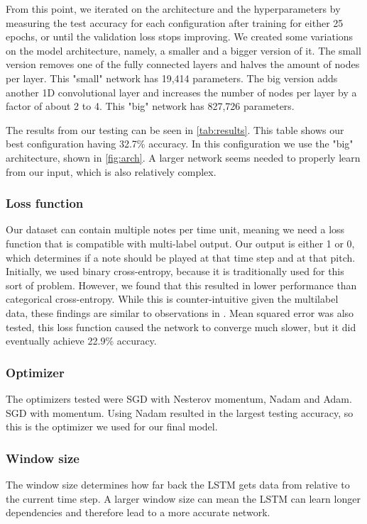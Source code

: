 \documentclass[11pt, twocolumn]{article}
\begin{document}
From this point, we iterated on the architecture and the hyperparameters by measuring the test accuracy for each configuration after training for either 25 epochs, or until the validation loss stops improving. We created some variations on the model architecture, namely, a smaller and a bigger version of it. The small version removes one of the fully connected layers and halves the amount of nodes per layer. This "small" network has 19,414 parameters. The big version adds another 1D convolutional layer and increases the number of nodes per layer by a factor of about 2 to 4. This "big" network has 827,726 parameters.

The results from our testing can be seen in \autoref{tab:results}. This table shows our best configuration having 32.7\% accuracy. In this configuration we use the "big" architecture, shown in \autoref{fig:arch}. A larger network seems needed to properly learn from our input, which is also relatively complex. 

\subsubsection{Loss function}
Our dataset can contain multiple notes per time unit, meaning we need a loss function that is compatible with multi-label output. Our output is either 1 or 0, which determines if a note should be played at that time step and at that pitch.
Initially, we used binary cross-entropy, because it is traditionally used for this sort of problem. However, we found that this resulted in lower performance than categorical cross-entropy. While this is counter-intuitive given the multilabel data, these findings are similar to observations in \cite{Mahajan_2018_ECCV}. Mean squared error was also tested, this loss function caused the network to converge much slower, but it did eventually achieve 22.9\% accuracy.

\subsubsection{Optimizer}
The optimizers tested were SGD with Nesterov momentum, Nadam and Adam. SGD with momentum. Using Nadam resulted in the largest testing accuracy, so this is the optimizer we used for our final model.

\subsubsection{Window size}
The window size determines how far back the LSTM gets data from relative to the current time step. A larger window size can mean the LSTM can learn longer dependencies and therefore lead to a more accurate network.
\end{document}
